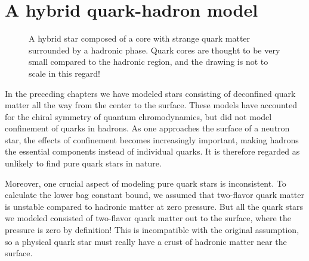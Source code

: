 \chapter{A hybrid quark-hadron model}
\label{chap:hybrid}

\begin{figure}[th!]
\centering
{}
\caption{\label{fig:hybrid:illustration}%
	A hybrid star composed of a core with strange quark matter surrounded by a hadronic phase.
	Quark cores are thought to be very small compared to the hadronic region, and the drawing is not to scale in this regard!
}
\end{figure}

In the preceding chapters we have modeled stars consisting of deconfined quark matter all the way from the center to the surface.
These models have accounted for the chiral symmetry of quantum chromodynamics,
but did not model confinement of quarks in hadrons.
As one approaches the surface of a neutron star,
the effects of confinement becomes increasingly important,
making hadrons the essential components instead of individual quarks.
It is therefore regarded as unlikely to find pure quark stars in nature.

Moreover, one crucial aspect of modeling pure quark stars is inconsistent.
To calculate the lower bag constant bound, we assumed that two-flavor quark matter is unstable compared to hadronic matter at zero pressure.
But all the quark stars we modeled consisted of two-flavor quark matter out to the surface,
where the pressure is zero by definition!
This is incompatible with the original assumption,
so a physical quark star must really have a crust of hadronic matter near the surface.

